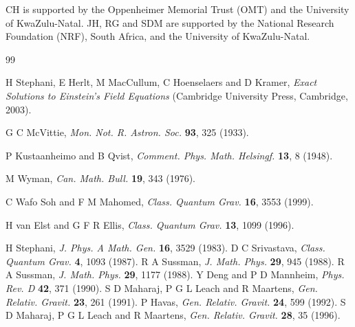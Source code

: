 \documentclass[abstract=on,notitlepage,superscriptaddress,nofootinbib,aps,showpacs,twocolumn,prd]{revtex4}
\newcommand{\0}{^{(0)}}
\newcommand{\1}{^{(1)}}
\newcommand{\2}{^{(2)}}
\newcommand{\3}{{}^{(3)}}
\begin{document}
\begin{acknowledgements} 
CH is supported by the Oppenheimer Memorial Trust (OMT) and the University of KwaZulu-Natal. JH, RG and SDM are supported by the National Research Foundation (NRF), South Africa, and the University of KwaZulu-Natal. 
\end{acknowledgements}






 

\begin{thebibliography}{99}
	
 H Stephani, E Herlt, M MacCullum, C Hoenselaers and D Kramer, {\it Exact Solutions to Einstein’s Field Equations} (Cambridge University Press, Cambridge, 2003).

 G C McVittie, \textit{Mon. Not. R. Astron. Soc.} \textbf{93}, 325 (1933).

 P Kustaanheimo and B Qvist, \textit{Comment. Phys. Math. Helsingf.} \textbf{13}, 8 (1948).

 M Wyman, \textit{Can. Math. Bull.} \textbf{19}, 343 (1976).

 C Wafo Soh and F M Mahomed, \textit{Class. Quantum Grav.} \textbf{16}, 3553 (1999).

 H van Elst and G F R Ellis, \textit{Class. Quantum Grav.} \textbf{13}, 1099 (1996).


 H Stephani, \textit{J. Phys. A Math. Gen.} \textbf{16}, 3529 (1983). 
 D C Srivastava, \textit{Class. Quantum Grav.} \textbf{4}, 1093 (1987).  
 R A Sussman, \textit{J. Math. Phys.} \textbf{29}, 945 (1988).
 R A Sussman, \textit{J. Math. Phys.} \textbf{29}, 1177 (1988).
 Y Deng and P D Mannheim, \textit{Phys. Rev. D} \textbf{42}, 371 (1990).
 S D Maharaj,  P G L Leach and R Maartens, \textit{Gen. Relativ. Gravit.} \textbf{23}, 261 (1991). 
 P Havas, \textit{Gen. Relativ. Gravit.} \textbf{24}, 599 (1992).
 S D Maharaj, P G L Leach and R Maartens, \textit{Gen. Relativ. Gravit.} \textbf{28}, 35 (1996). 



\end{thebibliography}
\end{document}
